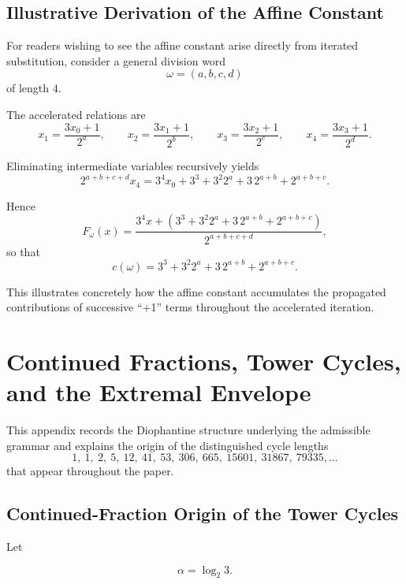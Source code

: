 \documentclass[12pt, oneside]{article}
\numberwithin{equation}{section}
\theoremstyle{definition}
\theoremstyle{plain}
\theoremstyle{remark}
\begin{document}


\subsection{Illustrative Derivation of the Affine Constant}

For readers wishing to see the affine constant arise directly from
iterated substitution, consider a general division word
\[
\omega=(a,b,c,d)
\]
of length \(4\).

The accelerated relations are
\[
x_1=\frac{3x_0+1}{2^a},
\qquad
x_2=\frac{3x_1+1}{2^b},
\qquad
x_3=\frac{3x_2+1}{2^c},
\qquad
x_4=\frac{3x_3+1}{2^d}.
\]

Eliminating intermediate variables recursively yields
\[
2^{a+b+c+d}x_4
=
3^4x_0
+
3^3
+
3^2 2^a
+
3\,2^{a+b}
+
2^{a+b+c}.
\]

Hence
\[
F_\omega(x)
=
\frac{
3^4x
+
\left(
3^3
+
3^2 2^a
+
3\,2^{a+b}
+
2^{a+b+c}
\right)
}{
2^{a+b+c+d}
},
\]
so that
\[
c(\omega)
=
3^3
+
3^2 2^a
+
3\,2^{a+b}
+
2^{a+b+c}.
\]

This illustrates concretely how the affine constant accumulates the
propagated contributions of successive ``+1'' terms throughout the
accelerated iteration.

\newpage
\section{Continued Fractions, Tower Cycles, and the Extremal Envelope}
\label{app:continued-fractions}

This appendix records the Diophantine structure underlying the admissible
grammar and explains the origin of the distinguished cycle lengths
\[
1,\ 1,\ 2,\ 5,\ 12,\ 41,\ 53,\ 306,\ 665,\ 15601,\ 31867,\ 79335,\ldots
\]
that appear throughout the paper.

\subsection{Continued-Fraction Origin of the Tower Cycles}

Let

\[
\alpha=\log_2 3.
\]
\end{document}

